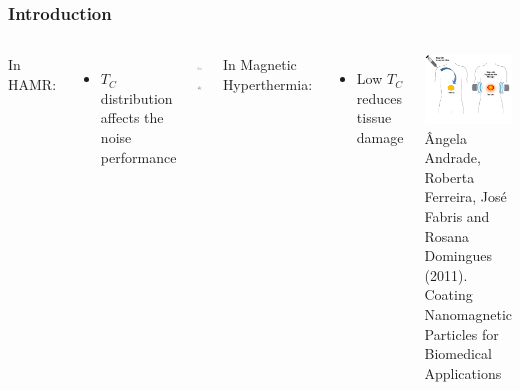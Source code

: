 \documentclass{beamer}
\begin{document}
\begin{frame}
	\frametitle{Introduction}
	\begin{columns}
		\column{6cm}
		In HAMR\footnotemark[1]:
		\begin{itemize}
			\item{$T_C$ distribution affects the noise performance}
		\end{itemize} \vspace{1mm}
		
		\begin{center}
		\includegraphics[width=2.9cm]{Images/coerc} \hspace{1mm}
		\includegraphics[width=2.9cm]{Images/laser} \\
		\tiny {}
		\end{center}
		
		\column{6cm}
		In Magnetic Hyperthermia\footnotemark[2]:
		\begin{itemize}
		\item{Low $T_C$ reduces tissue damage}
		\end{itemize}
		
		\begin{center}
		\includegraphics[width=4cm]{Images/person} \\
		\tiny \^{A}ngela Andrade, Roberta Ferreira, Jos\'{e} Fabris and Rosana Domingues (2011). Coating Nanomagnetic Particles for Biomedical Applications
		\end{center}
	\end{columns}
\end{frame}
\end{document}
